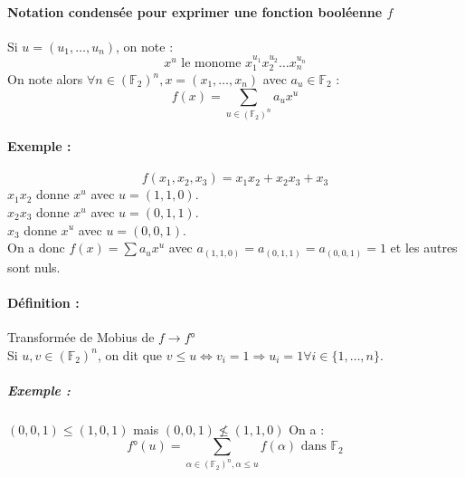 \documentclass[12pt,a4paper]{report}
\begin{document}
\paragraph{Notation condensée pour exprimer une fonction booléenne $f$\\}
Si $u=(u_1,\ldots,u_n)$, on note :
$$ x^u \mbox{ le monome } x_1^{u_1}x_2^{u_2}\ldots x_n^{u_n} $$
On note alors $ \forall n \in (\mathbb{F}_2)^n, x=(x_1,\ldots,x_n)$ avec $a_u \in \mathbb{F}_2$ :
$$ f(x) = \sum_{u \in (\mathbb{F}_2)^n}a_ux^u $$
\paragraph{Exemple :\\}
$$f(x_1,x_2,x_3)= x_1x_2+x_2x_3+x_3$$
$x_1x_2$ donne $x^u$ avec $u=(1,1,0)$.\\
$x_2x_3$ donne $x^u$ avec $u=(0,1,1)$.\\
$x_3$ donne $x^u$ avec $u=(0,0,1)$.\\
On a donc $f(x) = \sum a_ux^u $ avec $a_{(1,1,0)} = a_{(0,1,1)} = a_{(0,0,1)} = 1$ et les autres sont nuls.
\paragraph{Définition :} Transformée de Mobius de $f \rightarrow f°$ \\
Si $u,v \in (\mathbb{F}_2)^n$, on dit que $ v \leqslant u \Leftrightarrow v_i = 1 \Rightarrow u_i = 1 \forall i \in \{1,\ldots,n\}$.
\subparagraph{Exemple :\\}
$(0,0,1) \leqslant (1,0,1)$ mais $(0,0,1) \not\leqslant (1,1,0)$
On a :
$$ f°(u) = \sum_{\alpha \in (\mathbb{F}_2)^n, \alpha \leqslant u} f(\alpha) \mbox{ dans } \mathbb{F}_2$$
\end{document}
